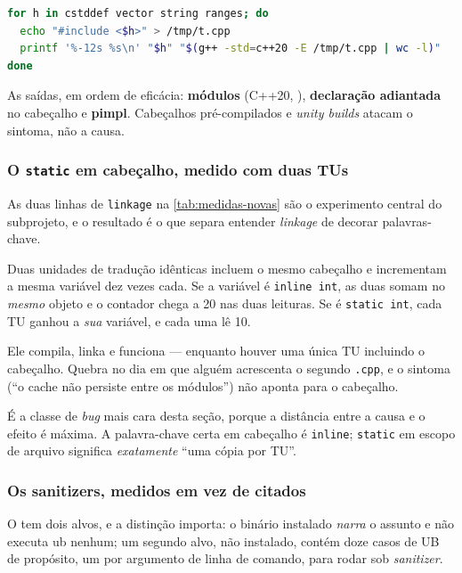 \begin{lstlisting}[style=bt, language=bash, caption={O reprodutor da
    \cref{tab:include-custo}, do \texttt{README.md} de \texttt{src/linkage/}.
    Rode no seu \emph{toolchain}: os números serão outros.}]
for h in cstddef vector string ranges; do
  echo "#include <$h>" > /tmp/t.cpp
  printf '%-12s %s\n' "$h" "$(g++ -std=c++20 -E /tmp/t.cpp | wc -l)"
done
\end{lstlisting}

As saídas, em ordem de eficácia: \textbf{módulos} (C++20, ),
\textbf{declaração adiantada} no cabeçalho e \textbf{pimpl}. Cabeçalhos
pré-compilados e \emph{unity builds} atacam o sintoma, não a causa.

\subsubsection{O \texttt{static} em cabeçalho, medido com duas TUs}

As duas linhas de \texttt{linkage} na \cref{tab:medidas-novas} são o
experimento central do subprojeto, e o resultado é o que separa entender
\emph{linkage} de decorar palavras-chave.

Duas unidades de tradução idênticas incluem o mesmo cabeçalho e incrementam a
mesma variável dez vezes cada. Se a variável é \texttt{inline int}, as duas
somam no \emph{mesmo} objeto e o contador chega a 20 nas duas leituras. Se é
\texttt{static int}, cada TU ganhou a \emph{sua} variável, e cada uma lê 10.

\begin{armadilha}
Ele compila, linka e funciona --- enquanto houver uma única TU incluindo o
cabeçalho. Quebra no dia em que alguém acrescenta o segundo \texttt{.cpp}, e o
sintoma (``o cache não persiste entre os módulos'') não aponta para o cabeçalho.

É a classe de \emph{bug} mais cara desta seção, porque a distância entre a
causa e o efeito é máxima. A palavra-chave certa em cabeçalho é
\texttt{inline}; \texttt{static} em escopo de arquivo significa
\emph{exatamente} ``uma cópia por TU''.
\end{armadilha}

\subsubsection{Os sanitizers, medidos em vez de citados}

O  tem dois alvos, e a distinção importa: o binário
instalado \emph{narra} o assunto e não executa \gls{ub} nenhum; um segundo
alvo, não instalado, contém doze casos de UB de propósito, um por argumento de
linha de comando, para rodar sob \emph{sanitizer}.

